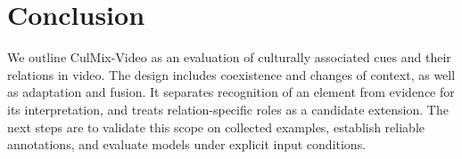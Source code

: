 \section{Conclusion}
\label{sec:conclusion}

We outline CulMix-Video as an evaluation of culturally associated cues and
their relations in video. The design includes coexistence and changes of
context, as well as adaptation and fusion. It separates recognition of an
element from evidence for its interpretation, and treats relation-specific
roles as a candidate extension. The next steps are to validate this scope
on collected examples, establish reliable annotations, and evaluate models
under explicit input conditions.
